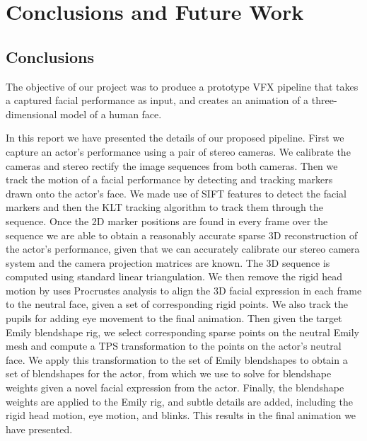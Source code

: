 \chapter{Conclusions and Future Work}
\section{Conclusions}
The objective of our project was to produce a prototype VFX pipeline that takes a captured facial performance as input, and creates an animation of a three-dimensional model of a human face. 

In this report we have presented the details of our proposed pipeline. First we capture an actor's performance using a pair of stereo cameras. We calibrate the cameras and stereo rectify the image sequences from both cameras. Then we track the motion of a facial performance by detecting and tracking markers drawn onto the actor's face. We made use of SIFT features to detect the facial markers and then the KLT tracking algorithm to track them through the sequence. Once the 2D marker positions are found in every frame over the sequence we are able to obtain a reasonably accurate sparse 3D reconstruction of the actor's performance, given that we can accurately calibrate our stereo camera system and the camera projection matrices are known. The 3D sequence is computed using standard linear triangulation. We then remove the rigid head motion by uses Procrustes analysis to align the 3D facial expression in each frame to the neutral face, given a set of corresponding rigid points. We also track the pupils for adding eye movement to the final animation. Then given the target Emily blendshape rig, we select corresponding sparse points on the neutral Emily mesh and compute a TPS transformation to the points on the actor's neutral face. We apply this transformation to the set of Emily blendshapes to obtain a set of blendshapes for the actor, from which we use to solve for blendshape weights given a novel facial expression from the actor. Finally, the blendshape weights are applied to the Emily rig, and subtle details are added, including the rigid head motion, eye motion, and blinks. This results in the final animation we have presented.

